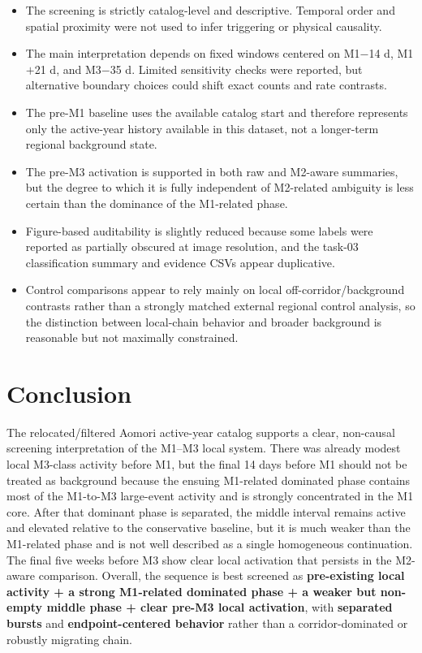 \documentclass[11pt]{article}
\begin{document}
\begin{itemize}[leftmargin=1.5em]
    \item The screening is strictly catalog-level and descriptive. Temporal order and spatial proximity were not used to infer triggering or physical causality.
    \item The main interpretation depends on fixed windows centered on M1$-$14 d, M1$+$21 d, and M3$-$35 d. Limited sensitivity checks were reported, but alternative boundary choices could shift exact counts and rate contrasts.
    \item The pre-M1 baseline uses the available catalog start and therefore represents only the active-year history available in this dataset, not a longer-term regional background state.
    \item The pre-M3 activation is supported in both raw and M2-aware summaries, but the degree to which it is fully independent of M2-related ambiguity is less certain than the dominance of the M1-related phase.
    \item Figure-based auditability is slightly reduced because some labels were reported as partially obscured at image resolution, and the task-03 classification summary and evidence CSVs appear duplicative.
    \item Control comparisons appear to rely mainly on local off-corridor/background contrasts rather than a strongly matched external regional control analysis, so the distinction between local-chain behavior and broader background is reasonable but not maximally constrained.
\end{itemize}

\section{Conclusion}
The relocated/filtered Aomori active-year catalog supports a clear, non-causal screening interpretation of the M1--M3 local system. There was already modest local M3-class activity before M1, but the final 14 days before M1 should not be treated as background because the ensuing M1-related dominated phase contains most of the M1-to-M3 large-event activity and is strongly concentrated in the M1 core. After that dominant phase is separated, the middle interval remains active and elevated relative to the conservative baseline, but it is much weaker than the M1-related phase and is not well described as a single homogeneous continuation. The final five weeks before M3 show clear local activation that persists in the M2-aware comparison. Overall, the sequence is best screened as \textbf{pre-existing local activity + a strong M1-related dominated phase + a weaker but non-empty middle phase + clear pre-M3 local activation}, with \textbf{separated bursts} and \textbf{endpoint-centered behavior} rather than a corridor-dominated or robustly migrating chain.
\end{document}
